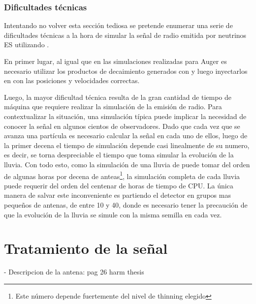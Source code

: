 		\subsubsection{Dificultades técnicas}

		Intentando no volver esta sección tediosa se pretende enumerar una serie de dificultades técnicas a la hora de simular la señal de radio emitida por neutrinos ES utilizando \zhs{}.

		En primer lugar, al igual que en las simulaciones realizadas para Auger es necesario utilizar los productos de decaimiento generados con \tauola{} y luego inyectarlos en \aires{} con las posiciones y velocidades correctas.

		Luego, la mayor dificultad técnica resulta de la gran cantidad de tiempo de máquina que requiere realizar la simulación de la emisión de radio.
		Para contextualizar la situación, una simulación típica puede implicar la necesidad de conocer la señal en algunos cientos de observadores.
		Dado que cada vez que se avanza una partícula es necesario calcular la señal en cada uno de ellos, luego de la primer decena el tiempo de simulación depende casi linealmente de su numero, es decir, se torna despreciable el tiempo que toma simular la evolución de la lluvia.
		Con todo esto, como la simulación de una lluvia de  puede tomar del orden de algunas horas por decena de anteas\footnote{Este número depende fuertemente del nivel de thinning elegido}, la simulación completa de cada lluvia puede requerir del orden del centenar de horas de tiempo de CPU.
		La única manera de salvar este inconveniente es partiendo el detector en grupos mas pequeños de antenas, de entre 10 y 40, donde es necesario tener la precaución de que la evolución de la lluvia se simule con la misma semilla en cada vez.

	
\section{Tratamiento de la se\~nal}
	
	- Descripcion de la antena: pag 26 harm thesis
	
	

